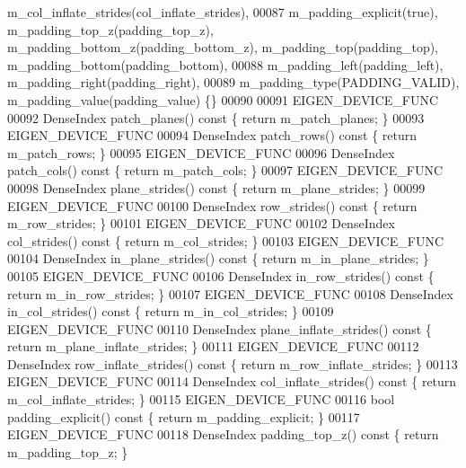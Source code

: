 \begin{DoxyCode}
      m\_col\_inflate\_strides(col\_inflate\_strides),
00087         m\_padding\_explicit(true), m\_padding\_top\_z(padding\_top\_z), m\_padding\_bottom\_z(padding\_bottom\_z), 
      m\_padding\_top(padding\_top), m\_padding\_bottom(padding\_bottom),
00088         m\_padding\_left(padding\_left), m\_padding\_right(padding\_right),
00089         m\_padding\_type(PADDING\_VALID), m\_padding\_value(padding\_value) \{\}
00090 
00091     EIGEN\_DEVICE\_FUNC
00092     DenseIndex patch\_planes()\textcolor{keyword}{ const }\{ \textcolor{keywordflow}{return} m\_patch\_planes; \}
00093     EIGEN\_DEVICE\_FUNC
00094     DenseIndex patch\_rows()\textcolor{keyword}{ const }\{ \textcolor{keywordflow}{return} m\_patch\_rows; \}
00095     EIGEN\_DEVICE\_FUNC
00096     DenseIndex patch\_cols()\textcolor{keyword}{ const }\{ \textcolor{keywordflow}{return} m\_patch\_cols; \}
00097     EIGEN\_DEVICE\_FUNC
00098     DenseIndex plane\_strides()\textcolor{keyword}{ const }\{ \textcolor{keywordflow}{return} m\_plane\_strides; \}
00099     EIGEN\_DEVICE\_FUNC
00100     DenseIndex row\_strides()\textcolor{keyword}{ const }\{ \textcolor{keywordflow}{return} m\_row\_strides; \}
00101     EIGEN\_DEVICE\_FUNC
00102     DenseIndex col\_strides()\textcolor{keyword}{ const }\{ \textcolor{keywordflow}{return} m\_col\_strides; \}
00103     EIGEN\_DEVICE\_FUNC
00104     DenseIndex in\_plane\_strides()\textcolor{keyword}{ const }\{ \textcolor{keywordflow}{return} m\_in\_plane\_strides; \}
00105     EIGEN\_DEVICE\_FUNC
00106     DenseIndex in\_row\_strides()\textcolor{keyword}{ const }\{ \textcolor{keywordflow}{return} m\_in\_row\_strides; \}
00107     EIGEN\_DEVICE\_FUNC
00108     DenseIndex in\_col\_strides()\textcolor{keyword}{ const }\{ \textcolor{keywordflow}{return} m\_in\_col\_strides; \}
00109     EIGEN\_DEVICE\_FUNC
00110     DenseIndex plane\_inflate\_strides()\textcolor{keyword}{ const }\{ \textcolor{keywordflow}{return} m\_plane\_inflate\_strides; \}
00111     EIGEN\_DEVICE\_FUNC
00112     DenseIndex row\_inflate\_strides()\textcolor{keyword}{ const }\{ \textcolor{keywordflow}{return} m\_row\_inflate\_strides; \}
00113     EIGEN\_DEVICE\_FUNC
00114     DenseIndex col\_inflate\_strides()\textcolor{keyword}{ const }\{ \textcolor{keywordflow}{return} m\_col\_inflate\_strides; \}
00115     EIGEN\_DEVICE\_FUNC
00116     \textcolor{keywordtype}{bool} padding\_explicit()\textcolor{keyword}{ const }\{ \textcolor{keywordflow}{return} m\_padding\_explicit; \}
00117     EIGEN\_DEVICE\_FUNC
00118     DenseIndex padding\_top\_z()\textcolor{keyword}{ const }\{ \textcolor{keywordflow}{return} m\_padding\_top\_z; \}

\end{DoxyCode}
